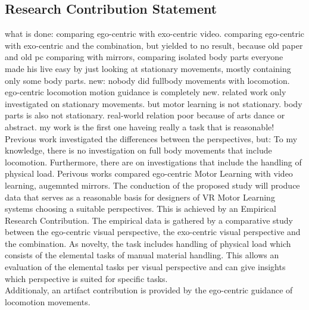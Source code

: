\subsection{Research Contribution Statement}
\label{delimination_contribution}
what is done: 
comparing ego-centric with exo-centric video.
comparing ego-centric with exo-centric and the combination, but yielded to no result, because old paper and old pc
comparing with mirrors,
comparing isolated body parts
everyone made his live easy by just looking at stationary movements, mostly containing only some body parts.
new: nobody did fullbody movements with locomotion. ego-centric locomotion motion guidance is completely new. 
related work only investigated on stationary movements. but motor learning is not stationary. body parts is also not stationary.
real-world relation poor because of arts dance or abstract. my work is the first one haveing really a task that is reasonable!\\
Previous work investigated the differences between the perspectives, but:
To my knowledge, there is no investigation on full body movements that include locomotion. Furthermore, there are on investigations that include the handling of physical load.
Perivous works compared ego-centric Motor Learning with video learning\cite{YouMove,vrdancetrainer}, augemnted mirrors\cite{perspectivematters,onebody}.
The conduction of the proposed study will produce data that serves as a reasonable basis for designers of VR Motor Learning systems choosing a suitable perspectives. This is achieved by an Empirical Research Contribution. The empirical data is gathered by a comparative study between the ego-centric visual perspective, the exo-centric visual perspective and the combination. As novelty, the task includes handling of physical load which consists of the elemental tasks of manual material handling. This allows an evaluation of the elemental tasks per visual perspective and can give insights which perspective is suited for specific tasks.\\
Additionaly, an artifact contribution is provided by the ego-centric guidance of locomotion movements.


